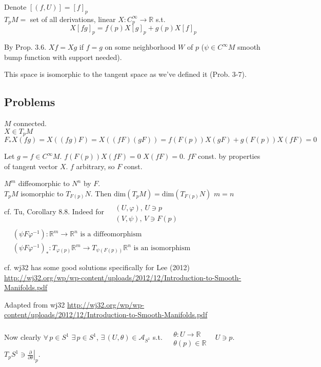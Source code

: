 Denote $[ (f,U)] = [f]_p$ \\
$T_p M = $ set of all derivations, linear $X: C_p^{\infty} \to \mathbb{R}$ s.t. 
\[
X[fg]_p = f(p) X[g]_p + g(p) X[f]_p
\]

By Prop. 3.6. $Xf = Xg$ if $f=g$ on some neighborhood $W$ of $p$ ($\psi \in C^{\infty}M$ smooth bump function with support needed).  

This space is isomorphic to the tangent space as we've defined it (Prob. 3-7).  




\subsection*{Problems}

 $M$ connected.  \\
$X \in T_pM$
\[
F_*X(fg) = X((fg)F) = X((fF)(gF)) = f(F(p)) X(gF) + g(F(p))X(fF) = 0 
\]

Let $g= f \in C^{\infty}M$.  $f(F(p))X(fF) = 0$ $X(fF) =0$.  $fF$ const. by properties of tangent vector $X$.  $f$ arbitrary, so $F$ const.  

 $M^m$ diffeomorphic to $N^n$ by $F$.  \\
$T_pM$ isomorphic to $T_{F(p)}N$.  Then $\text{dim}{ (T_pM)} = \text{dim}{ (T_{F(p)}N)}$  $m=n$  \\
cf. Tu, Corollary 8.8.  Indeed for $\begin{aligned} & \quad \\ 
  & (U,\varphi), \, U \ni p \\ 
  & (V, \psi ), \, V\ni F(p) \end{aligned}$ \quad \, $\begin{aligned} & \quad \\ 
  & (\psi F \varphi^{-1}):\mathbb{R}^m \to \mathbb{R}^n \text{ is a diffeomorphism } \\ 
  & (\psi F \varphi^{-1})_* : T_{ \varphi(p)} \mathbb{R}^m \to T_{\psi(F(p))} \mathbb{R}^n \text{ is an isomorphism } \end{aligned}$


cf. wj32 has some good solutions specifically for Lee (2012) \url{http://wj32.org/wp/wp-content/uploads/2012/12/Introduction-to-Smooth-Manifolds.pdf}

Adapted from wj32 \url{http://wj32.org/wp/wp-content/uploads/2012/12/Introduction-to-Smooth-Manifolds.pdf}

Now clearly $\forall \, p \in S^1 $ $\exists \, p \in S^1$, $\exists \, (U,\theta) \in \mathcal{A}_{S^1}$ s.t. $\begin{aligned} & \quad \\
  & \theta : U \to \mathbb{R} \\
  & \theta(p) \in \mathbb{R}
\end{aligned}$ \quad \, $U \ni p$.  $T_p S^1 \ni \left. \frac{ \partial }{ \partial \theta} \right|_p$.  

